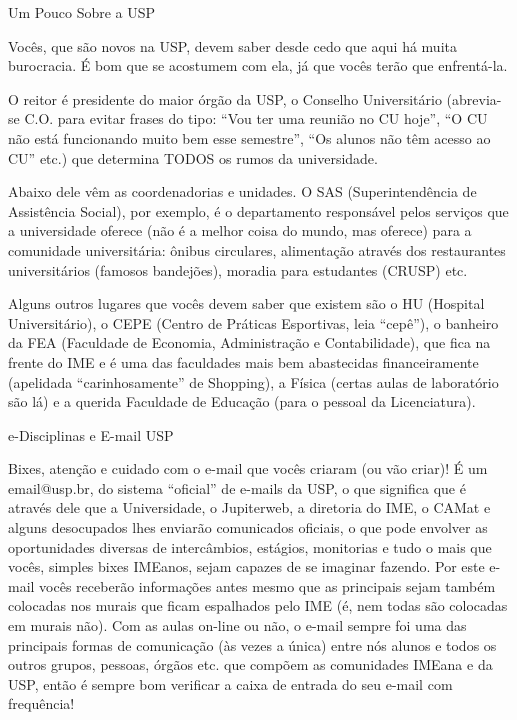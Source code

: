 \begin{secao}{Um Pouco Sobre a USP}

Vocês, que são novos na USP, devem saber desde cedo que aqui há muita
burocracia. É bom que se acostumem com ela, já que vocês terão que enfrentá-la.

O reitor é presidente do maior órgão da USP, o Conselho Universitário (abrevia-se
C.O. para evitar frases do tipo: ``Vou ter uma reunião no CU hoje'', ``O CU não
está funcionando muito bem esse semestre'', ``Os alunos não têm acesso ao CU''
etc.) que determina TODOS os rumos da universidade.

Abaixo dele vêm as coordenadorias e unidades. O SAS (Superintendência de Assistência Social),
por exemplo, é o departamento responsável pelos serviços
que a universidade oferece (não é a melhor coisa do mundo, mas oferece) para a
comunidade universitária: ônibus circulares, alimentação através dos restaurantes
universitários (famosos bandejões), moradia para estudantes (CRUSP) etc.

Alguns outros lugares que vocês devem saber que existem são o HU (Hospital
Universitário), o CEPE (Centro de Práticas Esportivas, leia ``cepê''), o banheiro
da FEA (Faculdade de Economia, Administração e Contabilidade), que fica na
frente do IME e é uma das faculdades mais bem abastecidas financeiramente
(apelidada ``carinhosamente'' de Shopping), a Física (certas aulas de laboratório são lá)
 e a querida Faculdade de Educação (para o pessoal da Licenciatura).

\begin{subsecao}{e-Disciplinas e E-mail USP}

Bixes, atenção e cuidado com o e-mail que vocês criaram (ou vão criar)! É um
email@usp.br, do sistema ``oficial'' de e-mails da USP, o que significa que é
através dele que a Universidade, o Jupiterweb, a diretoria do IME, o CAMat e
alguns desocupados lhes enviarão comunicados oficiais, o que pode envolver as
oportunidades diversas de intercâmbios, estágios, monitorias e tudo o mais que
vocês, simples bixes IMEanos, sejam capazes de se imaginar fazendo. Por este e-mail
vocês receberão informações antes mesmo que as principais sejam também colocadas
nos murais que ficam espalhados pelo IME (é, nem todas são colocadas em murais não).
Com as aulas on-line ou não, o e-mail sempre foi uma das principais formas de
comunicação (às vezes a única) entre nós alunos e todos os outros grupos, pessoas,
órgãos etc. que compõem as comunidades IMEana e da USP, então é sempre bom verificar
a caixa de entrada do seu e-mail com frequência! 


\end{subsecao}
\end{secao}
